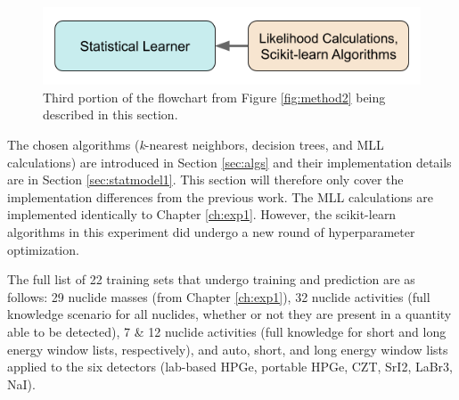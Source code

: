 
\begin{figure}[H]
  \centering
  \includegraphics[width=0.7\linewidth]{./chapters/exp2/methodology2_3.png}
  \caption[Third portion of the flowchart from Figure \ref{fig:method2}]
          {Third portion of the flowchart from Figure \ref{fig:method2} being 
           described in this section.}
\end{figure}

The chosen algorithms (\textit{k}-nearest neighbors, decision trees, and
\gls{MLL} calculations) are introduced in Section \ref{sec:algs} and their
implementation details are in Section \ref{sec:statmodel1}.  This section will
therefore only cover the implementation differences from the previous work.
The \gls{MLL} calculations are implemented identically to Chapter
\ref{ch:exp1}.  However, the scikit-learn algorithms in this experiment did
undergo a new round of hyperparameter optimization.

The full list of 22 training sets that undergo training and prediction are as
follows: 29 nuclide masses (from Chapter \ref{ch:exp1}), 32 nuclide activities
(full knowledge scenario for all nuclides, whether or not they are present in a
quantity able to be detected), 7 \& 12 nuclide activities (full knowledge for
short and long energy window lists, respectively), and auto, short, and long
energy window lists applied to the six detectors (lab-based \gls{HPGe},
portable \gls{HPGe}, \gls{CZT}, \gls{SrI2}, \gls{LaBr3}, \gls{NaI}). 


